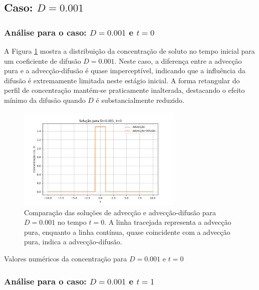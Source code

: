 \subsection{Caso: \( D = 0.001 \)}


\subsubsection{Análise para o caso: \( D = 0.001 \) e \( t = 0 \)}

A Figura \ref{fig:advec_diffus_0.001_t0} mostra a distribuição da concentração de soluto no tempo inicial para um coeficiente de difusão \( D = 0.001 \). Neste caso, a diferença entre a advecção pura e a advecção-difusão é quase imperceptível, indicando que a influência da difusão é extremamente limitada neste estágio inicial. A forma retangular do perfil de concentração mantém-se praticamente inalterada, destacando o efeito mínimo da difusão quando \( D \) é substancialmente reduzido.

\begin{figure}[H]
    \centering
    \includegraphics[width=0.7\textwidth]{code/plot/Advec_Difus_t0_D0.001.png}
    \caption{Comparação das soluções de advecção e advecção-difusão para \( D = 0.001 \) no tempo \( t = 0 \). A linha tracejada representa a advecção pura, enquanto a linha contínua, quase coincidente com a advecção pura, indica a advecção-difusão.}
    \label{fig:advec_diffus_0.001_t0}
\end{figure}

\begin{table}[H]
    \centering
    \caption{Valores numéricos da concentração para \( D = 0.001 \) e \( t = 0 \)}
    
\end{table}

\subsubsection{Análise para o caso: \( D = 0.001 \) e \( t = 1 \)}

